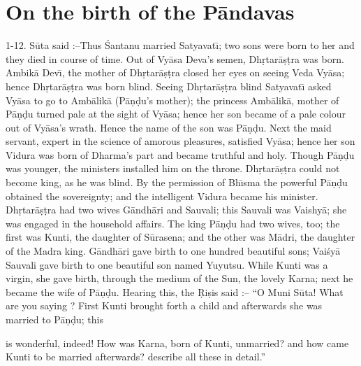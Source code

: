 \chapter{On the birth of the P\=andavas}

1-12. S\=uta said :--Thus \'Santanu married Satyavat\={\i}; two sons were born to her and they died in course of time. Out of Vy\=asa Deva's semen, Dh\d{r}tar\=a\d{s}\d{t}ra was born. Ambik\=a Dev\={\i}, the mother of Dh\d{r}tar\=a\d{s}\d{t}ra closed her eyes on seeing Veda Vy\=asa; hence Dh\d{r}tar\=a\d{s}\d{t}ra was born blind. Seeing Dh\d{r}tar\=a\d{s}\d{t}ra blind Satyavat\={\i} asked Vy\=asa to go to Amb\=alik\=a (P\=a\d{n}\d{d}u's mother); the princess Amb\=alik\=a, mother of P\=a\d{n}\d{d}u turned pale at the sight of Vy\=asa; hence her son became of a pale colour out of Vy\=asa's wrath. Hence the name of the son was P\=a\d{n}\d{d}u. Next the maid servant, expert in the science of amorous pleasures, satisfied Vy\=asa; hence her son Vidura was born of Dharma's part and became truthful and holy. Though P\=a\d{n}\d{d}u was younger, the ministers installed him on the throne. Dh\d{r}tar\=a\d{s}\d{t}ra could not become king, as he was blind. By the permission of Bh\={\i}sma the powerful P\=a\d{n}\d{d}u obtained the sovereignty; and the intelligent Vidura became his minister. Dh\d{r}tar\=a\d{s}\d{t}ra had two wives G\=andh\=ari and Sauvali; this Sauvali was Vaishy\=a; she was engaged in the household affairs. The king P\=a\d{n}\d{d}u had two wives, too; the first was Kunti, the daughter of S\=urasena; and the other was M\=adri, the daughter of the Madra king. G\=andh\=ari gave birth to one hundred beautiful sons; Vai\'sy\=a Sauvali gave birth to one beautiful son named Yuyutsu. While Kunti was a virgin, she gave birth, through the medium of the Sun, the lovely Karna; next he became the wife of P\=a\d{n}\d{d}u. Hearing this, the \d{R}i\d{s}is said :-- ``O Muni S\=uta! What are you saying ? First Kunti brought forth a child and afterwards she was married to P\=a\d{n}\d{d}u; this

is wonderful, indeed! How was Karna, born of Kunti, unmarried? and how came Kunti to be married afterwards? describe all these in detail.''

